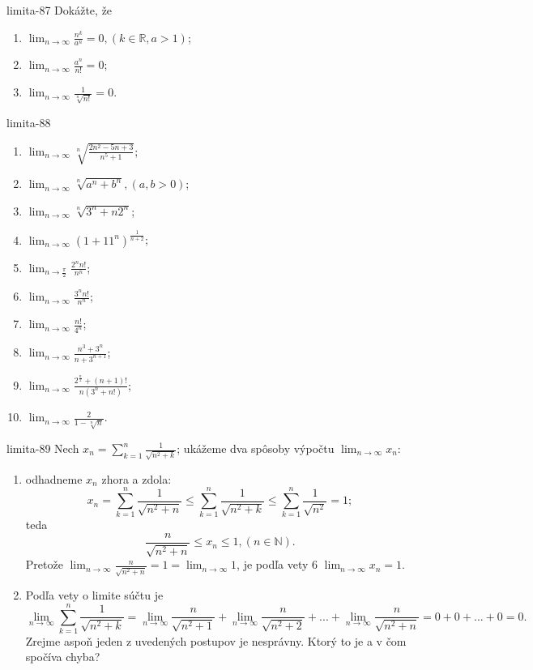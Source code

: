\begin{defproblem}{limita-87}
Dokážte, že
\begin{enumerate}
\item $\lim_{n \rightarrow \infty} \frac{n^k}{a^n}=0,(k \in \mathbb{R},a>1)$;
\item $\lim_{n \rightarrow \infty} \frac{a^n}{n!}=0$;
\item $\lim_{n \rightarrow \infty} \frac{1}{\sqrt[n]{n!}}=0$.
\end{enumerate}
\end{defproblem}

\begin{defproblem}{limita-88}
\begin{multicols}{2}
\begin{enumerate}
    \item $\lim_{n \rightarrow \infty} \sqrt[n]{\frac{2n^2-5n+3}{n^5+1}}$;
    \item $\lim_{n \rightarrow \infty} \sqrt[n]{a^n+b^n},(a,b>0)$;
    \item $\lim_{n \rightarrow \infty} \sqrt[n]{3^n+n2^n}$;
    \item $\lim_{n \rightarrow \infty} (1+11^n)^{\frac{1}{n+2}}$;
    \item $\lim_{n \rightarrow \frac{\pi}{2}} \frac{2^nn!}{n^n}$;
    \item $\lim_{n \rightarrow \infty} \frac{3^nn!}{n^n}$;
    \item $\lim_{n \rightarrow \infty} \frac{n!}{4^n}$;
    \item $\lim_{n \rightarrow \infty} \frac{n^3+3^n}{n+3^{n+1}}$;
    \item $\lim_{n \rightarrow \infty} \frac{2^{\frac{n}{2}}+(n+1)!}{n(3^n+n!)}$;
    \item $\lim_{n \rightarrow \infty} \frac{2}{1-\sqrt[n]{n}}$.
\end{enumerate}
\end{multicols}
\end{defproblem}

\begin{defproblem}{limita-89}
Nech $x_n=\sum_{k=1}^n \frac{1}{\sqrt{n^2+k}}$; ukážeme dva spôsoby výpočtu $\lim_{n \rightarrow \infty} x_n:$
\begin{enumerate}
\item odhadneme $x_n$ zhora a zdola:
$$x_n=\sum_{k=1}^n \frac{1}{\sqrt{n^2+n}}\leq \sum_{k=1}^n \frac{1}{\sqrt{n^2+k}}\leq \sum_{k=1}^n \frac{1}{\sqrt{n^2}}=1;$$
teda $$\frac{n}{\sqrt{n^2+n}}\leq x_n \leq 1, (n \in \mathbb{N}).$$
Pretože $\lim_{n \rightarrow \infty} \frac{n}{\sqrt{n^2+n}}=1=\lim_{n \rightarrow \infty} 1$, je podľa vety $6$ $\lim_{n \rightarrow \infty} x_n=1$.
\item Podľa vety o limite súčtu je
$$\lim_{n \rightarrow \infty} \sum_{k=1}^n \frac{1}{\sqrt{n^2+k}}=\lim_{n \rightarrow \infty} \frac{n}{\sqrt{n^2+1}}+\lim_{n \rightarrow \infty} \frac{n}{\sqrt{n^2+2}}+...+\lim_{n \rightarrow \infty} \frac{n}{\sqrt{n^2+n}}=0+0+...+0=0.$$
Zrejme aspoň jeden z uvedených postupov je nesprávny. Ktorý to je a v čom spočíva chyba?
\end{enumerate}
\end{defproblem}

